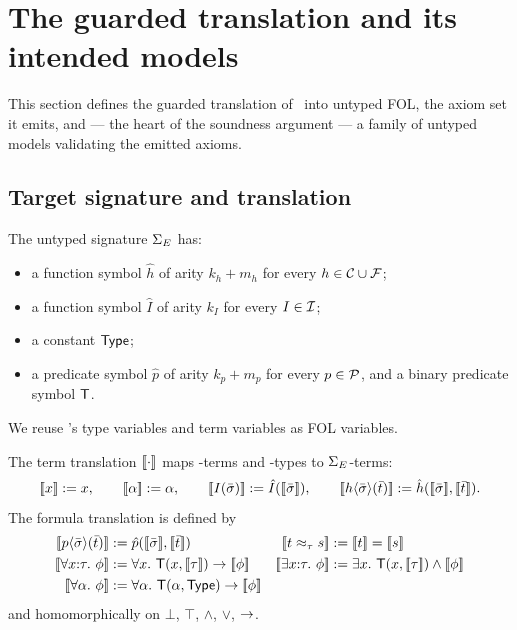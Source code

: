 \section{The guarded translation and its intended models}
\label{sec:translation}

This section defines the guarded translation of \Frag\ into untyped FOL,
the axiom set it emits, and --- the heart of the soundness argument --- a
family of untyped models validating the emitted axioms.

\subsection{Target signature and translation}

\begin{definition}
  \label{def:target-sig}
  The untyped signature $\Sigma_{E}$ has:
  \begin{itemize}
  \item a function symbol $\hat h$ of arity $k_h + m_h$ for every
    $h \in \mathcal{C} \cup \mathcal{F}$;
  \item a function symbol $\hat I$ of arity $k_I$ for every $I \in \mathcal{I}$;
  \item a constant $\mathsf{Type}$;
  \item a predicate symbol $\hat p$ of arity $k_p + m_p$ for every
    $p \in \mathcal{P}$, and a binary predicate symbol $\mathsf{T}$.
  \end{itemize}
  We reuse \Frag's type variables and term variables as FOL variables.
\end{definition}

\begin{definition}[Translation]
  \label{def:translation}
  The term translation $[\![ \cdot ]\!]$ maps \Frag-terms and \Frag-types to
  $\Sigma_{E}$-terms:
  \[
    \enc{x} \defeq x, \qquad
    \enc{\alpha} \defeq \alpha, \qquad
    \enc{I(\tup\sigma)} \defeq \hat I(\enc{\tup\sigma}), \qquad
    \enc{h\langle\tup\sigma\rangle(\tup t)} \defeq
      \hat h(\enc{\tup\sigma}, \enc{\tup t}).
  \]
  The formula translation is defined by
  \begin{align*}
    \enc{p\langle\tup\sigma\rangle(\tup t)}
      &\defeq \hat p(\enc{\tup\sigma}, \enc{\tup t})
    & \enc{t \eqx{\tau} s} &\defeq \enc{t} = \enc{s} \\
    \enc{\forall x{:}\tau.\ \phi}
      &\defeq \forall x.\ \T(x, \enc{\tau}) \imp \enc{\phi}
    & \enc{\exists x{:}\tau.\ \phi}
      &\defeq \exists x.\ \T(x, \enc{\tau}) \wedge \enc{\phi} \\
    \enc{\forall \alpha.\ \phi}
      &\defeq \forall \alpha.\ \T(\alpha, \TypeC) \imp \enc{\phi}
  \end{align*}
  and homomorphically on $\bot$, $\top$, $\wedge$, $\vee$, $\rightarrow$.
\end{definition}

